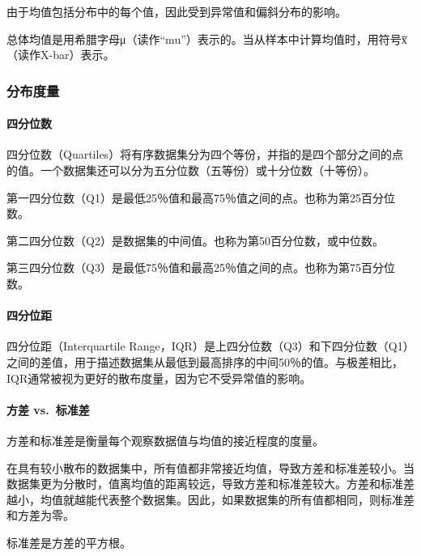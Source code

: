 \documentclass[]{book}
\let\oldparagraph\paragraph
\renewcommand{\paragraph}[1]{\oldparagraph{#1}\mbox{}}
\begin{document}
由于均值包括分布中的每个值，因此受到异常值和偏斜分布的影响。

总体均值是用希腊字母μ（读作``mu''）表示的。当从样本中计算均值时，用符号x̅（读作X-bar）表示。

\hypertarget{ux5206ux5e03ux5ea6ux91cf}{%
\subsubsection{分布度量}\label{ux5206ux5e03ux5ea6ux91cf}}

\hypertarget{ux56dbux5206ux4f4dux6570}{%
\paragraph{四分位数}\label{ux56dbux5206ux4f4dux6570}}

四分位数（Quartiles）将有序数据集分为四个等份，并指的是四个部分之间的点的值。一个数据集还可以分为五分位数（五等份）或十分位数（十等份）。

第一四分位数（Q1）是最低25％值和最高75％值之间的点。也称为第25百分位数。

第二四分位数（Q2）是数据集的中间值。也称为第50百分位数，或中位数。

第三四分位数（Q3）是最低75％值和最高25％值之间的点。也称为第75百分位数。

\hypertarget{ux56dbux5206ux4f4dux8ddd}{%
\paragraph{四分位距}\label{ux56dbux5206ux4f4dux8ddd}}

四分位距（Interquartile Range，IQR）是上四分位数（Q3）和下四分位数（Q1）之间的差值，用于描述数据集从最低到最高排序的中间50％的值。与极差相比，IQR通常被视为更好的散布度量，因为它不受异常值的影响。

\hypertarget{ux65b9ux5dee-vs.ux6807ux51c6ux5dee}{%
\paragraph{方差 vs.~标准差}\label{ux65b9ux5dee-vs.ux6807ux51c6ux5dee}}

方差和标准差是衡量每个观察数据值与均值的接近程度的度量。

在具有较小散布的数据集中，所有值都非常接近均值，导致方差和标准差较小。当数据集更为分散时，值离均值的距离较远，导致方差和标准差较大。方差和标准差越小，均值就越能代表整个数据集。因此，如果数据集的所有值都相同，则标准差和方差为零。

标准差是方差的平方根。
\end{document}
